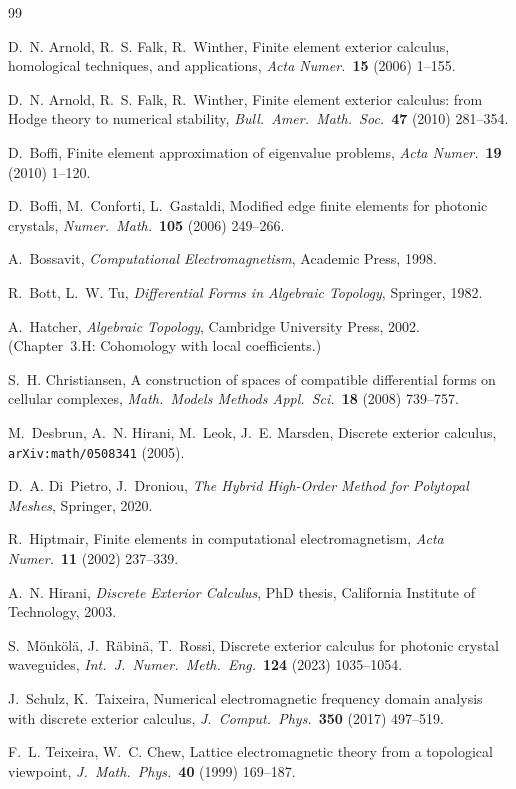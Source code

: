 \documentclass[12pt]{article}
\theoremstyle{definition}
\theoremstyle{remark}
\begin{document}
\begin{thebibliography}{99}

D.~N. Arnold, R.~S. Falk, R.~Winther,
Finite element exterior calculus, homological techniques, and applications,
\textit{Acta Numer.}~\textbf{15} (2006) 1--155.

D.~N. Arnold, R.~S. Falk, R.~Winther,
Finite element exterior calculus: from Hodge theory to numerical stability,
\textit{Bull.\ Amer.\ Math.\ Soc.}~\textbf{47} (2010) 281--354.

D.~Boffi,
Finite element approximation of eigenvalue problems,
\textit{Acta Numer.}~\textbf{19} (2010) 1--120.

D.~Boffi, M.~Conforti, L.~Gastaldi,
Modified edge finite elements for photonic crystals,
\textit{Numer.\ Math.}~\textbf{105} (2006) 249--266.

A.~Bossavit,
\textit{Computational Electromagnetism},
Academic Press, 1998.

R.~Bott, L.~W. Tu,
\textit{Differential Forms in Algebraic Topology},
Springer, 1982.

A.~Hatcher,
\textit{Algebraic Topology},
Cambridge University Press, 2002.
(Chapter~3.H: Cohomology with local coefficients.)

S.~H. Christiansen,
A construction of spaces of compatible differential forms on cellular complexes,
\textit{Math.\ Models Methods Appl.\ Sci.}~\textbf{18} (2008) 739--757.

M.~Desbrun, A.~N. Hirani, M.~Leok, J.~E. Marsden,
Discrete exterior calculus,
\texttt{arXiv:math/0508341} (2005).

D.~A. Di~Pietro, J.~Droniou,
\textit{The Hybrid High-Order Method for Polytopal Meshes},
Springer, 2020.

R.~Hiptmair,
Finite elements in computational electromagnetism,
\textit{Acta Numer.}~\textbf{11} (2002) 237--339.

A.~N. Hirani,
\textit{Discrete Exterior Calculus},
PhD thesis, California Institute of Technology, 2003.

S.~M\"onk\"ol\"a, J.~Räbinä, T.~Rossi,
Discrete exterior calculus for photonic crystal waveguides,
\textit{Int.\ J.\ Numer.\ Meth.\ Eng.}~\textbf{124} (2023) 1035--1054.

J.~Schulz, K.~Taixeira,
Numerical electromagnetic frequency domain analysis with discrete exterior calculus,
\textit{J.\ Comput.\ Phys.}~\textbf{350} (2017) 497--519.

F.~L. Teixeira, W.~C. Chew,
Lattice electromagnetic theory from a topological viewpoint,
\textit{J.\ Math.\ Phys.}~\textbf{40} (1999) 169--187.

\end{thebibliography}
\end{document}
